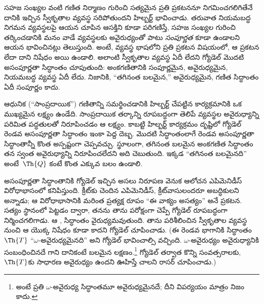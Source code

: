 \documentclass[../../../include/open-logic-section]{subfiles}
\begin{document}


సహజ సంఖ్యల వంటి గణిత నిర్మాణం గురించి సత్యమైన ప్రతి ప్రకటననూ
నిగమించగలిగితేనే దానికి ఇచ్చిన స్వీకృతాల వ్యవస్థ సరిపోతుందని హిల్బర్ట్
భావించాడు. తరువాత నియమబద్ధ నిగమన వ్యవస్థలపై ఆయన చూపిన ఆసక్తిని కూడా
పరిగణిస్తే, సహజ సంఖ్యల గురించి తర్కించడానికి మనం వాడే వ్యవస్థలకు
అవైరుధ్యంతో పాటు \emph{సంపూర్ణత} కూడా ఉండాలని ఆయన భావించినట్లు తెలుస్తుంది.
అంటే, వ్యవస్థ భాషలోని ప్రతి ప్రకటన విషయంలో, ఆ ప్రకటన లేదా దాని నిషేధం
 అయి ఉండాలి. అలాంటి స్వీకృతాల వ్యవస్థ ఏదీ లేదని గ్యోడెల్ మొదటి అసంపూర్ణతా
సిద్ధాంతం చూపుతుంది: అంకగణితానికి సంపూర్ణమైన, అవైరుధ్యమైన,
 నియమబద్ధ వ్యవస్థ ఏదీ లేదు. నిజానికి,
``తగినంత బలమైన,'' అవైరుధ్యమైన,  గణిత సిద్ధాంతం
ఏదీ సంపూర్ణం కాదు.

ఆధునిక (``సాంప్రదాయిక'') గణితాన్ని సమర్థించడానికి హిల్బర్ట్ చేపట్టిన
కార్యక్రమానికి ఒక ముఖ్యమైన లక్ష్యం ఉండేది. సాంప్రదాయిక తర్కాన్ని
రూపబద్ధంగా తెలిపే వ్యవస్థల అవైరుధ్యాన్ని పరిమిత పద్ధతులతో
నిరూపించడం ఆ లక్ష్యం.
కాబట్టి హిల్బర్ట్ కార్యక్రమం దృష్టిలో గ్యోడెల్ రెండవ అసంపూర్ణతా సిద్ధాంతం ఇంకా
పెద్ద దెబ్బ. మొదటి సిద్ధాంతంలాగే రెండవ అసంపూర్ణతా సిద్ధాంతాన్నీ కొంత అస్పష్టంగా
చెప్పవచ్చు. స్థూలంగా, తగినంత బలమైన అంకగణిత సిద్ధాంతం తన స్వంత అవైరుధ్యాన్ని
నిరూపించలేదని అది చెబుతుంది. ఇక్కడ ``తగినంత బలమైనది'' అంటే~$\Th{Q}$ కంటే కొంత ఎక్కువ బలం ఉండాలి.

అసంపూర్ణతా సిద్ధాంతానికి గ్యోడెల్ ఇచ్చిన అసలు నిరూపణ వెనుక ఆలోచన ఎపిమెనిడీస్
విరోధాభాసంలో కనిపిస్తుంది. క్రీట్‌కు చెందిన ఎపిమెనిడీస్, క్రీట్‌వాసులందరూ
అబద్ధికులని అన్నాడు; ఆ విరోధాభాసానికి మరింత ప్రత్యక్ష రూపం ``ఈ వాక్యం
అసత్యం'' అనే ప్రకటన. సత్యం స్థానంలో  పెట్టడం ద్వారా,
తనను తాను  పరోక్షంగా చెప్పే
 గ్యోడెల్ రూపబద్ధంగా నిర్మించగలిగాడు. ఆ
 , సిద్ధాంతం వైరుధ్యమవుతుంది.
తాను పరిశీలించిన స్వీకృతాల వ్యవస్థ నుంచి ఆ  యొక్క నిషేధం కూడా
 కాదని గ్యోడెల్ చూపించాడు. (ఈ రెండవ భాగానికి
సిద్ధాంతం~$\Th{T}$ ``$\omega$-అవైరుధ్యమైనది'' అని గ్యోడెల్ భావించాల్సి వచ్చింది.
$\omega$-అవైరుధ్యం అవైరుధ్యానికి సంబంధించినదే గాని దానికంటే బలమైన
లక్షణం.\footnote{అంటే ప్రతి $\omega$-అవైరుధ్య సిద్ధాంతమూ అవైరుధ్యమైనదే;
దీని విపర్యయం మాత్రం నిజం కాదు.} గ్యోడెల్ తర్వాత కొన్ని సంవత్సరాలకు,
$\Th{T}$కు సాధారణ అవైరుధ్యం ఉందని ఊహిస్తే చాలని రాసర్ చూపించాడు.)
\end{document}

